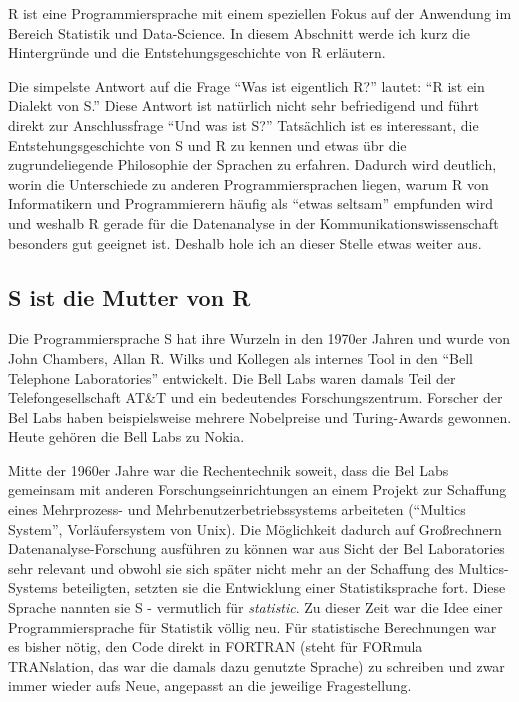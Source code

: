 \documentclass[
]{book}
\begin{document}
R ist eine Programmiersprache mit einem speziellen Fokus auf der Anwendung im Bereich Statistik und Data-Science. In diesem Abschnitt werde ich kurz die Hintergründe und die Entstehungsgeschichte von R erläutern.

Die simpelste Antwort auf die Frage ``Was ist eigentlich R?'' lautet: ``R ist ein Dialekt von S.'' \citep{Peng_2020}
Diese Antwort ist natürlich nicht sehr befriedigend und führt direkt zur Anschlussfrage
``Und was ist S?'' Tatsächlich ist es interessant, die Entstehungsgeschichte von S und R zu kennen und etwas übr die zugrundeliegende Philosophie der Sprachen zu erfahren.
Dadurch wird deutlich, worin die Unterschiede zu anderen Programmiersprachen liegen, warum
R von Informatikern und Programmierern häufig als ``etwas seltsam'' empfunden wird und weshalb R gerade
für die Datenanalyse in der Kommunikationswissenschaft besonders gut geeignet ist.
Deshalb hole ich an dieser Stelle etwas weiter aus.

\hypertarget{s-ist-die-mutter-von-r}{%
\subsection{S ist die Mutter von R}\label{s-ist-die-mutter-von-r}}

Die Programmiersprache S hat ihre Wurzeln in den 1970er Jahren und wurde von John Chambers,
Allan R. Wilks und Kollegen als internes Tool in den ``Bell Telephone Laboratories'' entwickelt.
Die Bell Labs waren damals Teil der Telefongesellschaft AT\&T und ein bedeutendes Forschungszentrum.
Forscher der Bel Labs haben beispielsweise mehrere Nobelpreise und Turing-Awards gewonnen.
Heute gehören die Bell Labs zu Nokia.

Mitte der 1960er Jahre war die Rechentechnik soweit, dass die Bel Labs gemeinsam mit anderen
Forschungseinrichtungen an einem Projekt zur Schaffung eines Mehrprozess- und Mehrbenutzerbetriebssystems arbeiteten (``Multics System'', Vorläufersystem von Unix).
Die Möglichkeit dadurch auf Großrechnern Datenanalyse-Forschung ausführen zu können war aus Sicht der Bel Laboratories sehr relevant und obwohl sie sich später nicht mehr an der Schaffung des Multics-Systems beteiligten, setzten sie die Entwicklung einer Statistiksprache fort. Diese Sprache nannten sie S - vermutlich für \emph{statistic}.
Zu dieser Zeit war die Idee einer Programmiersprache für Statistik völlig neu.
Für statistische Berechnungen war es bisher nötig, den Code direkt in FORTRAN (steht für FORmula TRANslation, das war die damals dazu genutzte Sprache) zu schreiben und zwar immer wieder aufs Neue, angepasst an die jeweilige Fragestellung.
\end{document}
